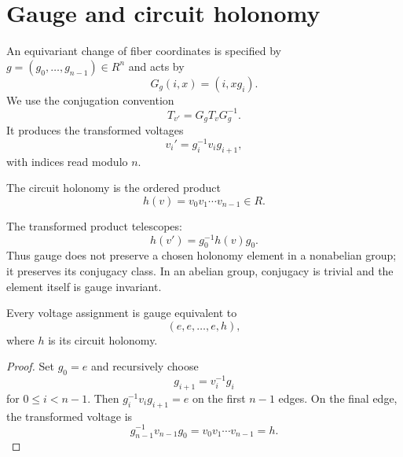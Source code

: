 \section{Gauge and circuit holonomy}

An equivariant change of fiber coordinates is specified by
$g=(g_0,\ldots,g_{n-1})\in R^n$ and acts by
\[
G_g(i,x)=(i,xg_i).
\]
We use the conjugation convention
\[
T_{v'}=G_gT_vG_g^{-1}.
\]
It produces the transformed voltages
\[
v_i'=g_i^{-1}v_i g_{i+1},
\]
with indices read modulo $n$.

\begin{definition}
The circuit holonomy is the ordered product
\[
h(v)=v_0v_1\cdots v_{n-1}\in R.
\]
\end{definition}

The transformed product telescopes:
\[
h(v')=g_0^{-1}h(v)g_0.
\]
Thus gauge does not preserve a chosen holonomy element in a nonabelian group;
it preserves its conjugacy class. In an abelian group, conjugacy is trivial
and the element itself is gauge invariant.

\begin{proposition}
Every voltage assignment is gauge equivalent to
\[
(e,e,\ldots,e,h),
\]
where $h$ is its circuit holonomy.
\end{proposition}

\begin{proof}
Set $g_0=e$ and recursively choose
\[
g_{i+1}=v_i^{-1}g_i
\]
for $0\leq i<n-1$. Then $g_i^{-1}v_i g_{i+1}=e$ on the first $n-1$
edges. On the final edge, the transformed voltage is
\[
g_{n-1}^{-1}v_{n-1}g_0
=v_0v_1\cdots v_{n-1}=h.
\]
\end{proof}

